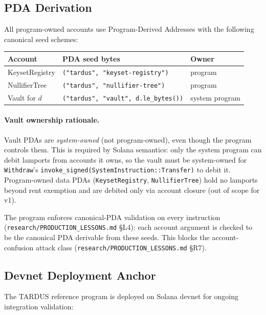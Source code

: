 \subsection{PDA Derivation}
\label{sec:onchain-pda}

All program-owned accounts use Program-Derived Addresses with the following canonical seed schemes:

\begin{center}
\begin{tabular}{lll}
\toprule
Account & PDA seed bytes & Owner \\
\midrule
KeysetRegistry & \texttt{("tardus", "keyset-registry")}      & program           \\
NullifierTree  & \texttt{("tardus", "nullifier-tree")}       & program           \\
Vault for $d$  & \texttt{("tardus", "vault", d.le\_bytes())} & system program    \\
\bottomrule
\end{tabular}
\end{center}

\paragraph{Vault ownership rationale.} Vault PDAs are
\emph{system-owned} (not program-owned), even though the program
controls them. This is required by Solana semantics: only the system
program can debit lamports from accounts it owns, so the vault must
be system-owned for \texttt{Withdraw}'s
\verb|invoke_signed(SystemInstruction::Transfer)| to debit it.
Program-owned data PDAs (\texttt{KeysetRegistry},
\texttt{NullifierTree}) hold no lamports beyond rent exemption and
are debited only via account closure (out of scope for v1).

The program enforces canonical-PDA validation on every instruction
(\texttt{research/PRODUCTION\_LESSONS.md} §L4): each account argument is
checked to be the canonical PDA derivable from these seeds. This
blocks the account-confusion attack class
(\texttt{research/PRODUCTION\_LESSONS.md} §R7).

\subsection{Devnet Deployment Anchor}
\label{sec:onchain-deployment}

The TARDUS reference program is deployed on Solana devnet for
ongoing integration validation:

